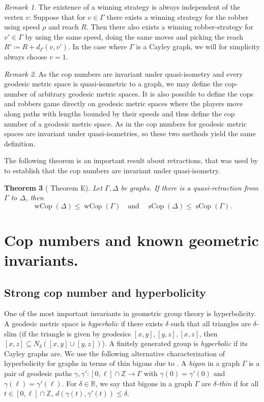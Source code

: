 \documentclass{amsart}
\newtheorem{theorem}{Theorem}[section]
\theoremstyle{definition}
\theoremstyle{remark}
\newtheorem{remark}[theorem]{Remark}
\theoremstyle{remark}
\theoremstyle{definition}
\newcommand{\sCop}{\operatorname{sCop}}
\newcommand{\wCop}{\operatorname{wCop}}
\renewcommand{\leq}{\leqslant}
\begin{document}
\begin{remark}
	The existence of a winning strategy is always independent of the vertex \(v\):
	Suppose that for \(v \in \Gamma\) there exists a winning strategy for the robber using speed \(\rho\) and reach \(R\).
	Then there also exists a winning robber-strategy for \(v' \in \Gamma\) by using the same speed, doing the same moves and picking the reach \(R' \coloneq R + d_\Gamma(v, v')\).
	In the case where \(\Gamma\) is a Cayley graph, we will for simplicity always choose \(v = 1\).
\end{remark}
\begin{remark}
	As the cop numbers are invariant under quasi-isometry and every geodesic metric space is quasi-isometric to a graph, we may define the cop-number of arbitrary geodesic metric spaces.
	It is also possible to define the cops and robbers game directly on geodesic metric spaces where the players move along paths with lengths bounded by their speeds and thus define the cop number of a geodesic metric space. As in \cite[Theorem 4.2]{LMR23} the cop numbers for geodesic metric spaces are invariant under quasi-isometries, so these two methods yield the same definition.
\end{remark}

The following theorem is an important result about retractions, that was used by \cite{LMR23} to establish that the cop numbers are invariant under quasi-isometry.
\begin{theorem}[\cite{LMR23} Theorem E]\label{thm:retract}
    Let $\Gamma, \Delta$ be graphs. If there is a quasi-retraction from $\Gamma$ to $\Delta$, then
    $$
    \wCop (\Delta) \leq \wCop(\Gamma) \quad \text{and} \quad \sCop (\Delta) \leq \sCop(\Gamma).
    $$
\end{theorem}


\section{Cop numbers and known geometric invariants.}\label{sec:hyp}
\subsection{Strong cop number and hyperbolicity}

One of the most important invariants in geometric group theory is hyperbolicity. A geodesic metric space is \emph{hyperbolic} if there exists $\delta$ such that all triangles are $\delta$-slim (if the triangle is given by geodesics $[x,y], [y,z], [x,z]$, then $[x,z] \subseteq N_\delta([x,y] \cup [y,z]) $). A finitely generated group is \emph{hyperbolic} if its Cayley graphs are. We use the following alternative characterization of hyperbolicity for graphs in terms of thin bigons due to \cite{Pap95}. A \emph{bigon} in a graph $\Gamma$ is a pair of geodesic paths $\gamma, \gamma' \colon [0, \ell]\cap \mathbb{Z} \to \Gamma$ with $\gamma(0) = \gamma'(0)$ and $\gamma(\ell) = \gamma'(\ell)$. For $\delta \in \mathbb{R}$, we say that bigons in a graph $\Gamma$ are \emph{$\delta$-thin} if for all $t \in [0,\ell] \cap \mathbb{Z}$, $d(\gamma(t),\gamma'(t) ) \leq \delta$.
\end{document}

